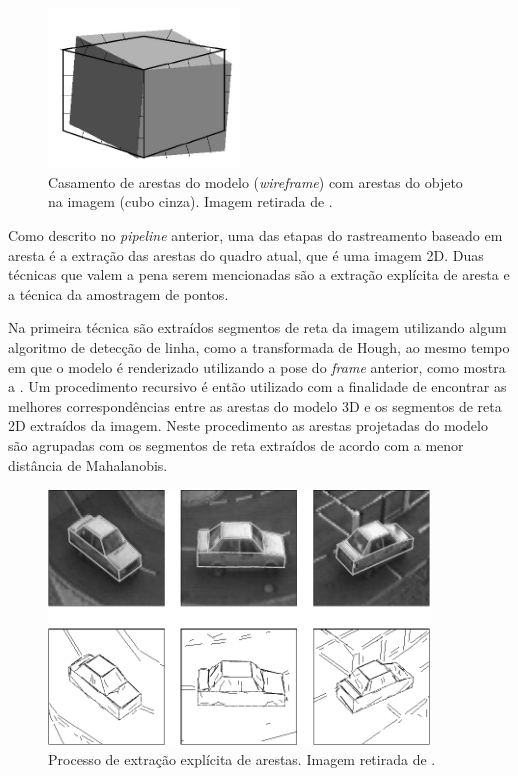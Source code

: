 \begin{figure}[!ht]
\centering\includegraphics[width=2in]{monografia/cubo_pipeline_drummond}
\caption{Casamento de arestas do modelo (\emph{wireframe}) com arestas do objeto na imagem (cubo cinza). Imagem retirada de \cite{drummondecipolla}.}
\label{cubo_pipeline_drummond}
\end{figure}

Como descrito no \emph{pipeline} anterior, uma das etapas do rastreamento baseado em aresta é a extração das arestas do quadro atual, que é uma imagem 2D. Duas técnicas que valem a pena serem mencionadas são a extração explícita de aresta \cite{extracao_explicita} e a técnica da amostragem de pontos\cite{drummondecipolla}.

Na primeira técnica são extraídos segmentos de reta da imagem utilizando algum algoritmo de detecção de linha, como a transformada de Hough, ao mesmo tempo em que o modelo é renderizado utilizando a pose do \emph{frame} anterior, como mostra a . Um procedimento recursivo é então utilizado com a finalidade de encontrar as melhores correspondências entre as arestas do modelo 3D e os segmentos de reta 2D extraídos da imagem. Neste procedimento as arestas projetadas do modelo são agrupadas com os segmentos de reta extraídos de acordo com a menor distância de Mahalanobis.

\begin{figure}[!t]
\centering\includegraphics[width=0.9\textwidth]{monografia/carro_extracao_explicita}
\caption{Processo de extração explícita de arestas. Imagem retirada de \cite{extracao_explicita}.}
\label{carro_extracao_explicita}
\end{figure}

